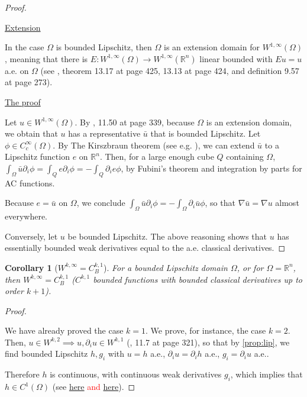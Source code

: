 \documentclass[english,a4paper,9pt,oneside]{scrbook}	%
\theoremstyle{break}
\newtheorem{cor}[equation]{Corollary}
\newenvironment{mproof}[1][\proofname]{%
  \begin{proof}[#1]$ $\par\nobreak\ignorespaces
}{%
  \end{proof}
}
\renewcommand*{\proofname}{Proof}
\theoremstyle{remark}
\newcommand{\mR}{\mathbb{R}}
\newcommand{\ds}{\displaystyle}
\begin{document}
\begin{appendices}
\begin{mproof}
\underline{Extension}

In the case $\Omega$ is bounded Lipschitz, then $\Omega$ is an extension domain for $W^{1,\infty}(\Omega)$, meaning that there is $E: W^{1,\infty}(\Omega)\rightarrow W^{1,\infty}(\mathbb{R}^n)$ linear bounded with $Eu=u$ a.e. on $\Omega$ (see \cite{leoni}, theorem 13.17 at page 425, 13.13 at page 424, and definition 9.57 at page 273).

\underline{The proof}

Let $u \in  W^{1,\infty}(\Omega)$. By \cite{leoni}, 11.50 at page 339, because $\Omega$ is an extension domain, we obtain that $u$ has a representative $\bar{u}$ that is bounded Lipschitz. Let $\phi \in C_c^\infty(\Omega)$. By The Kirszbraun theorem (see e.g. \cite{kirszbraun}), we can extend $\bar{u}$ to a Lipschitz function $e$ on $\mathbb{R}^n$. Then, for a large enough cube $Q$ containing $\Omega$, $\ds \int_\Omega\bar{u}\partial_i\phi = \int_Q e \partial_i \phi  = -\int_Q \partial_i e \phi $, by Fubini's theorem and integration by parts for AC functions.

Because $e=\bar{u}$	on $\Omega$, we conclude $\ds \int_\Omega\bar{u}\partial_i\phi =-\int_{\Omega} \partial_i \bar{u} \phi $, so that $\nabla \bar{u} = \nabla u$ almost everywhere.

Conversely, let $u$ be bounded Lipschitz. The above reasoning shows that $u$ has essentially bounded weak derivatives equal to the a.e. classical derivatives.

\end{mproof}

\begin{cor}[$W^{k,\infty}=C^{k,1}_B$]
\label{prop:lipk}
For a bounded Lipschitz domain $\Omega$, or for $\Omega = \mR^n$, then $W^{k,\infty}=C^{k,1}_B$ ($C^{k,1}$ bounded functions with bounded classical derivatives up to order $k+1$).
\end{cor}
\begin{mproof}

We have already proved the case $k=1$. We prove, for instance, the case $k=2$. Then, $u \in W^{k,2} \implies u, \partial_i u \in W^{k,1}$ (\cite{leoni}, 11.7 at page 321), so that by \cref{prop:lip}, we find bounded Lipschitz $h, g_i$ with $u=h$ a.e., $\partial_i u = \partial_i h$ a.e., $g_i = \partial_i u$ a.e..

Therefore $h$ is continuous, with continuous weak derivatives $g_i$, which implies that $h \in C^1(\Omega)$ (see \textcolor{red}{\href{https://math.stackexchange.com/questions/497708/is-a-continuous-function-with-continuous-weak-derivatives-of-class-c1}{here} and \href{https://math.stackexchange.com/questions/1787716/u-continuous-and-the-weak-derivative-du-continuous-rightarrow-u-in-c1}{here}}).


\end{mproof}
\end{appendices}
\end{document}
